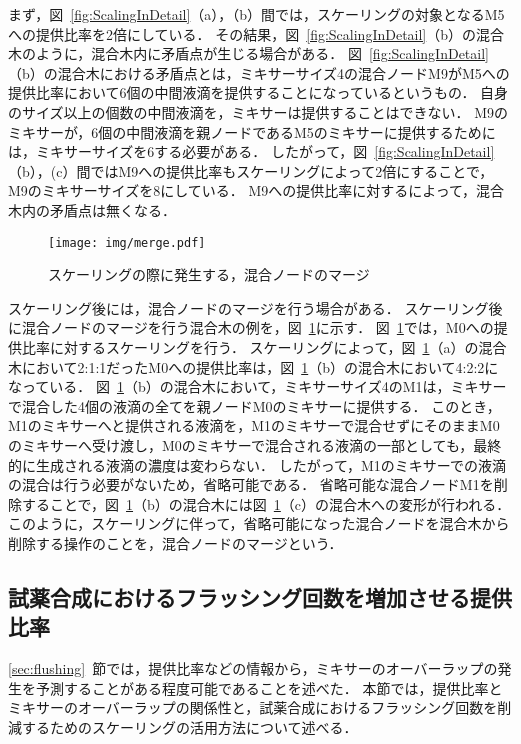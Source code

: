 まず，図~\ref{fig:ScalingInDetail}（a），（b）間では，スケーリングの対象となるM5への提供比率を2倍にしている．
その結果，図~\ref{fig:ScalingInDetail}（b）の混合木のように，混合木内に矛盾点が生じる場合がある．
図~\ref{fig:ScalingInDetail}（b）の混合木における矛盾点とは，ミキサーサイズ4の混合ノードM9がM5への提供比率において6個の中間液滴を提供することになっているというもの．
自身のサイズ以上の個数の中間液滴を，ミキサーは提供することはできない．
M9のミキサーが，6個の中間液滴を親ノードであるM5のミキサーに提供するためには，ミキサーサイズを6する必要がある．
したがって，図~\ref{fig:ScalingInDetail}（b），(c）間ではM9への提供比率もスケーリングによって2倍にすることで，M9のミキサーサイズを8にしている．
M9への提供比率に対するによって，混合木内の矛盾点は無くなる．

\begin{figure}[tbp]
 \centering\texttt{[image: img/merge.pdf]}
 \caption{スケーリングの際に発生する，混合ノードのマージ}\label{fig:Merge}
\end{figure}

スケーリング後には，混合ノードのマージを行う場合がある．
スケーリング後に混合ノードのマージを行う混合木の例を，図~\ref{fig:Merge}に示す．
図~\ref{fig:Merge}では，M0への提供比率に対するスケーリングを行う．
スケーリングによって，図~\ref{fig:Merge}（a）の混合木において2:1:1だったM0への提供比率は，図~\ref{fig:Merge}（b）の混合木において4:2:2になっている．
図~\ref{fig:Merge}（b）の混合木において，ミキサーサイズ4のM1は，ミキサーで混合した4個の液滴の全てを親ノードM0のミキサーに提供する．
このとき，M1のミキサーへと提供される液滴を，M1のミキサーで混合せずにそのままM0のミキサーへ受け渡し，M0のミキサーで混合される液滴の一部としても，最終的に生成される液滴の濃度は変わらない．
したがって，M1のミキサーでの液滴の混合は行う必要がないため，省略可能である．
省略可能な混合ノードM1を削除することで，図~\ref{fig:Merge}（b）の混合木には図~\ref{fig:Merge}（c）の混合木への変形が行われる．
このように，スケーリングに伴って，省略可能になった混合ノードを混合木から削除する操作のことを，混合ノードのマージという．

\subsection{試薬合成におけるフラッシング回数を増加させる提供比率}\label{ratio}
\ref{sec:flushing}~節では，提供比率などの情報から，ミキサーのオーバーラップの発生を予測することがある程度可能であることを述べた．
本節では，提供比率とミキサーのオーバーラップの関係性と，試薬合成におけるフラッシング回数を削減するためのスケーリングの活用方法について述べる．

